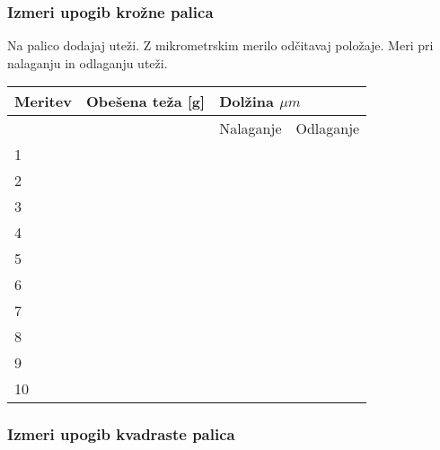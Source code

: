 \documentclass[11pt, a4paper]{article}
\begin{document}
\subsubsection{Izmeri upogib krožne palica}

Na palico dodajaj uteži. Z mikrometrskim merilo odčitavaj položaje. Meri pri nalaganju in odlaganju uteži. 
\begin{center}
    \begin{tabular}{|l|l|ll|}
\hline
Meritev & Obešena teža {[}g{]} & \multicolumn{2}{l|}{Dolžina $ \mu m $}               \\ \hline
        &                      & \multicolumn{1}{l|}{Nalaganje} & Odlaganje \\ \hline
1       &                      & \multicolumn{1}{l|}{}          &           \\ \hline
2       &                      & \multicolumn{1}{l|}{}          &           \\ \hline
3       &                      & \multicolumn{1}{l|}{}          &           \\ \hline
4       &                      & \multicolumn{1}{l|}{}          &           \\ \hline
5       &                      & \multicolumn{1}{l|}{}          &           \\ \hline
6       &                      & \multicolumn{1}{l|}{}          &           \\ \hline
7       &                      & \multicolumn{1}{l|}{}          &           \\ \hline
8       &                      & \multicolumn{1}{l|}{}          &           \\ \hline
9       &                      & \multicolumn{1}{l|}{}          &           \\ \hline
10      &                      & \multicolumn{1}{l|}{}          &           \\ \hline
\end{tabular}
\end{center}
\subsubsection{Izmeri upogib kvadraste palica}
\end{document}

